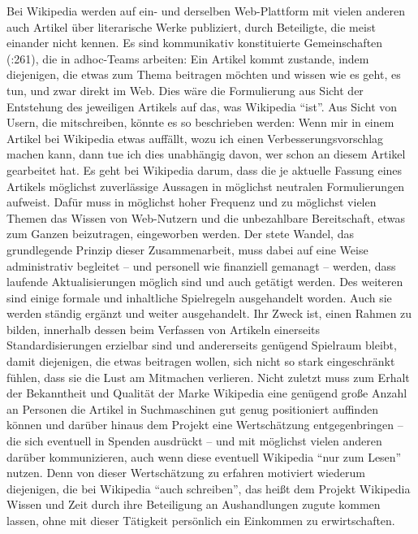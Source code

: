 \documentclass[fontsize=12pt]{scrartcl}
\begin{document}
Bei Wi\-ki\-pe\-dia werden auf ein- und derselben Web-Plattform mit vielen anderen auch Artikel \"uber li\-te\-ra\-rische Werke pu\-bli\-ziert, durch Beteiligte, die meist einander nicht kennen. Es sind kommunikativ konstituierte Gemeinschaften (\cite{Krotz2005}:261), die in adhoc-Teams arbei\-ten: Ein Artikel kommt zustande, indem diejenigen, die etwas zum Thema beitragen m\"ochten und wissen wie es geht, es tun, und zwar direkt im Web. Dies w\"are die Formulierung aus Sicht der Entstehung des jeweiligen Artikels auf das, was Wi\-ki\-pe\-dia "`ist"'. Aus Sicht von Usern, die mitschrei\-ben, k\"onnte es so beschrieben werden: Wenn mir in einem Artikel bei Wi\-ki\-pe\-dia etwas auff\"allt, wozu ich einen Verbesserungsvorschlag machen kann, dann tue ich dies unabh\"angig davon, wer schon an diesem Artikel gearbeitet hat. Es geht bei Wi\-ki\-pe\-dia darum, dass die je aktuelle Fassung eines Artikels m\"oglichst zuverl\"assige Aussagen in m\"oglichst neutralen Formulierungen aufweist. Daf\"ur muss in m\"oglichst hoher Frequenz und zu m\"oglichst vielen Themen das Wissen von Web-Nutzern\textsuperscript{\tiny *} und die unbezahlbare Be\-reit\-schaft, etwas zum Ganzen beizutragen, eingeworben werden. Der stete Wandel, das grundlegende Prinzip dieser Zusammenarbeit, muss dabei auf eine Weise ad\-mi\-ni\-stra\-tiv begleitet -- und personell wie finanziell gemanagt -- werden, dass laufende Aktualisierungen m\"oglich sind und auch get\"atigt werden.
Des weiteren sind einige formale und inhaltliche Spielregeln ausgehandelt worden. Auch sie werden st\"andig erg\"anzt und weiter ausgehandelt. Ihr Zweck ist, einen Rahmen zu bilden, innerhalb dessen beim Verfassen von Artikeln einerseits Standardisierungen erzielbar sind und an\-de\-rerseits gen\"ugend Spielraum bleibt, damit diejenigen, die etwas beitragen wollen, sich nicht so stark eingeschr\"ankt f\"uhlen, dass sie die Lust am Mitmachen verlieren. Nicht zu\-letzt muss zum Erhalt der Bekanntheit und Qualit\"at der Marke Wi\-ki\-pe\-dia eine gen\"ugend gro{\ss}e Anzahl an Per\-so\-nen die Artikel in Suchmaschinen gut genug positioniert auffinden k\"onnen und dar\"uber hinaus dem Projekt eine Wertsch\"atzung entgegenbringen -- die sich eventuell in Spenden ausdr\"uckt -- und mit m\"oglichst vielen anderen dar\"uber kommunizieren, auch wenn diese eventuell Wi\-ki\-pe\-dia "`nur zum Lesen"' nutzen. Denn von dieser Wertsch\"atzung zu erfahren moti\-viert wiederum diejenigen, die bei Wi\-ki\-pe\-dia "`auch schrei\-ben"', das hei{\ss}t dem Projekt Wi\-ki\-pe\-dia Wissen und Zeit durch ihre Beteiligung an Aushandlungen zugute kommen lassen, ohne mit dieser T\"atigkeit pers\"onlich ein Einkommen zu erwirtschaften.
\end{document}
